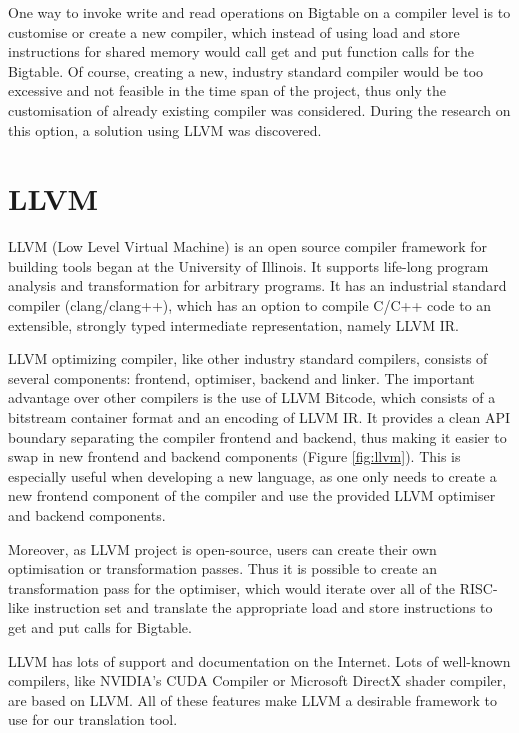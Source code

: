 \documentclass[bsc,frontabs,twoside,singlespacing,parskip,deptreport]{infthesis}     %
\begin{document}
One way to invoke write and read operations on Bigtable on a compiler level is to customise or create a new compiler, which instead of using load and store instructions for shared memory would call get and put function calls for the Bigtable. Of course, creating a new, industry standard compiler would be too excessive and not feasible in the time span of the project, thus only the customisation of already existing compiler was considered. During the research on this option, a solution using LLVM was discovered. 

\section{LLVM}


LLVM (Low Level Virtual Machine) is an open source compiler framework for building tools began at the University of Illinois. It supports life-long program analysis and transformation for arbitrary programs. It has an industrial standard compiler (clang/clang++), which has an option to compile C/C++ code to an extensible, strongly typed intermediate representation, namely LLVM IR.

LLVM optimizing compiler, like other industry standard compilers, consists of several components: frontend, optimiser, backend and linker. The important advantage over other compilers is the use of LLVM Bitcode, which consists of a bitstream container format and an encoding of LLVM IR. It provides a clean API boundary separating the compiler frontend and backend, thus making it easier to swap in new frontend and backend components (Figure \ref{fig:llvm}). This is especially useful when developing a new language, as one only needs to create a new frontend component of the compiler and use the provided LLVM optimiser and backend components. 

Moreover, as LLVM project is open-source, users can create their own optimisation or transformation passes. Thus it is possible to create an transformation pass for the optimiser, which would iterate over all of the RISC-like instruction set and translate the appropriate load and store instructions to get and put calls for Bigtable.

LLVM has lots of support and documentation on the Internet. Lots of well-known compilers, like NVIDIA's CUDA Compiler or Microsoft DirectX shader compiler, are based on LLVM. All of these features make LLVM a desirable framework to use for our translation tool.
\end{document}
